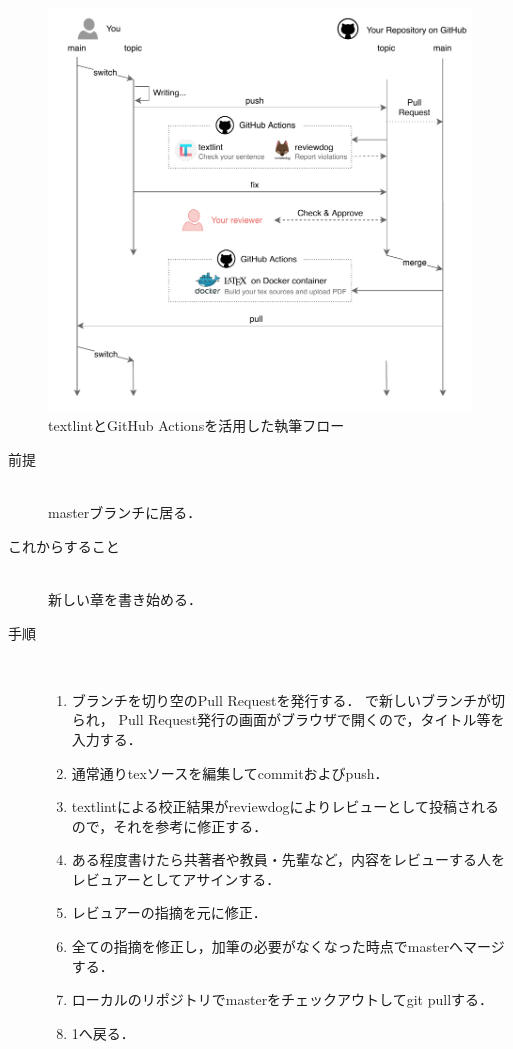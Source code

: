 \documentclass[main]{subfiles}
\begin{document}
\begin{figure}[h]
    \centering
    \includegraphics[keepaspectratio,scale=1.0]{../figures/textlint_workflow.pdf}
    \caption{textlintとGitHub Actionsを活用した執筆フロー}
    \label{fig:workflow}
\end{figure}

\begin{description}
    \item[前提]　\\
        masterブランチに居る．
    \item[これからすること]　\\
        新しい章を書き始める．
    \item[手順]　\\
        \begin{enumerate}
            \item ブランチを切り空のPull Requestを発行する．
                で新しいブランチが切られ，
                Pull Request発行の画面がブラウザで開くので，タイトル等を入力する．
            \item 通常通りtexソースを編集してcommitおよびpush．
            \item textlintによる校正結果がreviewdogによりレビューとして投稿されるので，それを参考に修正する．
            \item ある程度書けたら共著者や教員・先輩など，内容をレビューする人をレビュアーとしてアサインする．
            \item レビュアーの指摘を元に修正．
            \item 全ての指摘を修正し，加筆の必要がなくなった時点でmasterへマージする．
            \item ローカルのリポジトリでmasterをチェックアウトしてgit pullする．
            \item 1へ戻る．
        \end{enumerate}
\end{description}
\end{document}
